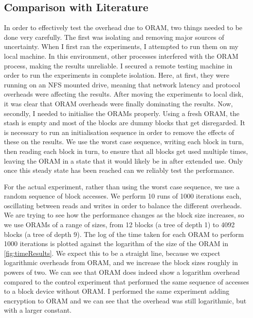 \documentclass[12pt,a4paper,twoside,openright]{report}
\begin{document}
\subsection{Comparison with Literature}
\label{subsec:comparisonWithLiterature}

In order to effectively test the overhead due to ORAM, two things needed to be done very carefully. The first was isolating and removing major sources of uncertainty. When I first ran the experiments, I attempted to run them on my local machine. In this environment, other processes interfered with the ORAM process, making the results unreliable. I secured a remote testing machine in order to run the experiments in complete isolation. Here, at first, they were running on an NFS mounted drive, meaning that network latency and protocol overheads were affecting the results. After moving the experiments to local disk, it was clear that ORAM overheads were finally dominating the results. Now, secondly, I needed to initialise the ORAMs properly. Using a fresh ORAM, the stash is empty and most of the blocks are dummy blocks that get disregarded. It is necessary to run an initialisation sequence in order to remove the effects of these on the results. We use the worst case sequence, writing each block in turn, then reading each block in turn, to ensure that all blocks get used multiple times, leaving the ORAM in a state that it would likely be in after extended use. Only once this steady state has been reached can we reliably test the performance.

For the actual experiment, rather than using the worst case sequence, we use a random sequence of block accesses. We perform 10 runs of 1000 iterations each, oscillating between reads and writes in order to balance the different overheads. We are trying to see how the performance changes as the block size increases, so we use ORAMs of a range of sizes, from 12 blocks (a tree of depth 1) to 4092 blocks (a tree of depth 9). The log of the time taken for each ORAM to perform 1000 iterations is plotted against the logarithm of the size of the ORAM in \cref{fig:timeResults}. We expect this to be a straight line, because we expect logarithmic overheads from ORAM, and we increase the block sizes roughly in powers of two. We can see that ORAM does indeed show a logarithm overhead compared to the control experiment that performed the same sequence of accesses to a block device without ORAM. I performed the same experiment adding encryption to ORAM and we can see that the overhead was still logarithmic, but with a larger constant.
\end{document}
